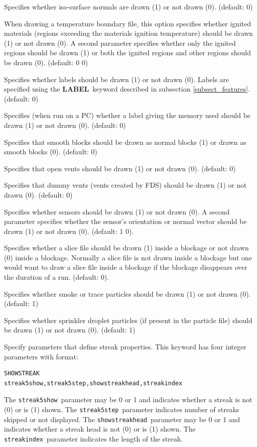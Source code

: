 \documentclass[11pt,twoside]{book}
\newcommand{\hitem}[1]{\item[{\bf #1} \hfill]}
\begin{document}
\hitem{SHOWISONORMALS} Specifies whether iso-surface normals are drawn (1) or not drawn (0).  (default: 0)

\hitem{SHOWIGNITION} When drawing a temperature boundary file, this option
specifies whether ignited materials (regions exceeding the materials ignition temperature) should be drawn (1) or not drawn (0).  A second parameter specifies whether only the ignited regions should be drawn (1) or both the ignited regions and other regions should be drawn (0).
(default: 0 0)


\hitem{SHOWLABELS}Specifies whether labels should be drawn (1) or
not drawn (0).  Labels are specified using the {\bf LABEL}\
keyword described in subsection \ref{subsect_features}. (default:
0)

\hitem{SHOWMEMLOAD} Specifies (when run on a PC) whether a label
giving the memory used should be drawn (1) or not drawn (0).
(default: 0)

\hitem{SHOWNORMALWHENSMOOTH} Specifies that smooth blocks
should be drawn as normal blocks (1) or drawn as smooth
blocks (0). (default: 0)

\hitem{SHOWOPENVENTS} Specifies that open vents should be drawn
(1) or not drawn (0).  (default: 0)

\hitem{SHOWDUMMYVENTS} Specifies that dummy vents (vents created
by FDS) should be drawn (1) or not drawn (0).  (default: 0)

\hitem{SHOWSENSORS} Specifies whether sensors should be drawn (1) or not drawn (0).
A second parameter specifies whether the sensor's orientation or normal vector
should be drawn (1) or not drawn (0). (default: 1 0).

\hitem{SHOWSLICEINOBST} Specifies whether a slice file should be drawn (1) inside
a blockage or not drawn (0) inside a blockage.  Normally a slice file is not drawn inside a blockage but one would want to draw a
slice file inside a blockage if the blockage disappears over the duration of a run.  (default: 0).


\hitem{SHOWSMOKEPART}Specifies whether smoke or trace particles
should be drawn (1) or not drawn (0). (default: 1)

\hitem{SHOWSPRINKPART}Specifies whether
sprinkler droplet particles (if present in the particle file)
should be drawn (1) or not drawn (0).
(default: 1)

\hitem{SHOWSTREAK}Specify parameters that define streak properties.  This keyword
has four integer parameters with format:
\begin{lstlisting}
SHOWSTREAK
streak5show,streak5step,showstreakhead,streakindex
\end{lstlisting}
The {\tt streak5show}\ parameter may be 0 or 1 and indicates whether a
streak is not (0) or is (1) shown. The {\tt streak5step}\ parameter
indicates number of streaks skipped or not displayed.
The {\tt showstreakhead}\ parameter may be 0 or 1 and indicates whether a streak head is not (0) or is (1) shown.
The {\tt streakindex}\ parameter indicates the length of the streak.
\end{document}
